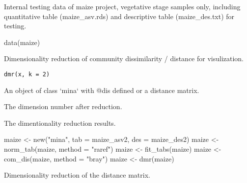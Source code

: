 \documentclass[a4paper]{book}
\begin{document}
%
\begin{Description}\relax
Internal testing data of maize project, vegetative stage samples only,
including quantitative table (maize\_asv.rds) and descriptive table
(maize\_des.txt) for testing.
\end{Description}
%
\begin{Examples}
\begin{ExampleCode}
data(maize)
\end{ExampleCode}
\end{Examples}
%
\begin{Description}\relax
Dimensionality reduction of community dissimilarity / distance for
visulization.
\end{Description}
%
\begin{Usage}
\begin{verbatim}
dmr(x, k = 2)
\end{verbatim}
\end{Usage}
%
\begin{Arguments}
\begin{ldescription}
\item[\code{x}] An object of class `mina` with @dis defined or a distance matrix.

\item[\code{k}] The dimension number after reduction.
\end{ldescription}
\end{Arguments}
%
\begin{Value}
The dimentionality reduction results.
\end{Value}
%
\begin{Examples}
\begin{ExampleCode}
maize <- new("mina", tab = maize_asv2, des = maize_des2)
maize <- norm_tab(maize, method = "raref")
maize <- fit_tabs(maize)
maize <- com_dis(maize, method = "bray")
maize <- dmr(maize)
\end{ExampleCode}
\end{Examples}
%
\begin{Description}\relax
Dimensionality reduction of the distance matrix.
\end{Description}
\end{document}
